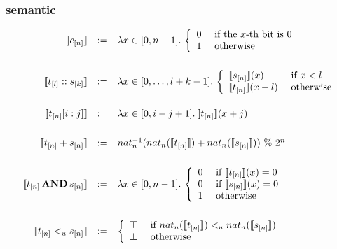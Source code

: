 \begin{frame}
  \frametitle{\bitvector semantic}

  \scriptsize
  $$
  \begin{array}{rcl}
    \inter{\w{c}{n}} & := & \lambda x \in [0,n-1].\, 
    \left\{
    \begin{array}{ll}
      0 & \mbox{ if the } x\mbox{-th bit is } 0 \\
      1 & \mbox{ otherwise } 
    \end{array}
    \right. \\
    \medskip \\
    \inter{\w{t}{l} :: \w{s}{k}} & := & \lambda x \in [0,\ldots,l+k-1].\,
    \left\{
    \begin{array}{ll}
      \inter{\w{s}{n}}(x) & \mbox{ if } x < l \\
      \inter{\w{t}{n}}(x-l) & \mbox{ otherwise } 
    \end{array}
    \right. \\
    \smallskip \\
    \inter{\w{t}{n}[i:j]} & := & \lambda x \in [0,i-j+1].\, \inter{\w{t}{n}}(x+j) \\
    \medskip \\
    \inter{\w{t}{n} + \w{s}{n}} & := & nat_n^{-1}(nat_n(\inter{\w{t}{n}}) + nat_n(\inter{\w{s}{n}}))\ \%\ 2^n \\
    \medskip \\
    \inter{\w{t}{n} \band \w{s}{n}} & := & \lambda x \in [0,n-1].\,
    \left\{
    \begin{array}{ll}
    0 & \mbox{ if } \inter{\w{t}{n}}(x) = 0 \\
    0 & \mbox{ if } \inter{\w{s}{n}}(x) = 0 \\
    1 & \mbox{ otherwise } 
    \end{array} 
    \right. \\
    \medskip \\
    \inter{\w{t}{n} <_u \w{s}{n}} & := & 
    \left\{
    \begin{array}{ll}
    \top & \mbox{ if } nat_n(\inter{\w{t}{n}}) <_{u} 
                       nat_n(\inter{\w{s}{n}}) \\
    \bot & \mbox{ otherwise } 
    \end{array}
    \right.
  \end{array}
  $$

\end{frame}
